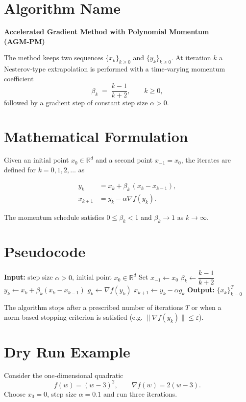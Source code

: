 \documentclass{article}
\begin{document}
\section*{Algorithm Name}
\textbf{Accelerated Gradient Method with Polynomial Momentum (AGM‑PM)}  

The method keeps two sequences \(\{x_k\}_{k\ge 0}\) and \(\{y_k\}_{k\ge 0}\).  
At iteration \(k\) a Nesterov‑type extrapolation is performed with a
time‑varying momentum coefficient
\[
\beta_k \;=\; \frac{k-1}{k+2},\qquad k\ge 0,
\]
followed by a gradient step of constant step size \(\alpha>0\).

\section*{Mathematical Formulation}
Given an initial point \(x_{0}\in\mathbb{R}^{d}\) and a second point
\(x_{-1}=x_{0}\), the iterates are defined for \(k=0,1,2,\dots\) as  

\[
\boxed{
\begin{aligned}
y_k &= x_k + \beta_k\,(x_k-x_{k-1}), \\[4pt]
x_{k+1} &= y_k - \alpha \nabla f(y_k).
\end{aligned}}
\tag{1}
\]

The momentum schedule satisfies \(0\le\beta_k<1\) and \(\beta_k\to 1\) as
\(k\to\infty\).

\section*{Pseudocode}
\begin{algorithm}[H]
\caption{AGM‑PM}
\begin{algorithmic}[1]
\STATE \textbf{Input:} step size \(\alpha>0\), initial point \(x_0\in\mathbb{R}^d\)
\STATE Set \(x_{-1}\leftarrow x_0\)
    \STATE \(\beta_k \gets \dfrac{k-1}{k+2}\)
    \STATE \(y_k \gets x_k + \beta_k (x_k - x_{k-1})\)
    \STATE \(g_k \gets \nabla f(y_k)\)
    \STATE \(x_{k+1} \gets y_k - \alpha g_k\)
\ENDFOR
\STATE \textbf{Output:} \(\{x_k\}_{k=0}^{T}\)
\end{algorithmic}
\end{algorithm}

The algorithm stops after a prescribed number of iterations \(T\) or
when a norm‑based stopping criterion is satisfied (e.g. \(\| \nabla
f(y_k)\|\le\varepsilon\)).

\section*{Dry Run Example}
Consider the one‑dimensional quadratic
\[
f(w) = (w-3)^2 ,\qquad \nabla f(w)=2(w-3).
\]
Choose \(x_0=0\), step size \(\alpha =0.1\) and run three iterations.
\end{document}
